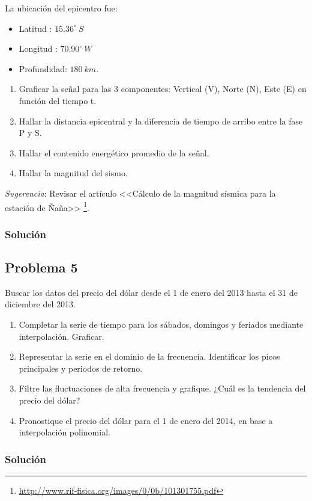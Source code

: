 \documentclass[a4paper,12pt,final]{article}
\begin{document}
      \noindent La ubicación del epicentro fue:

      \begin{itemize}
        \item Latitud    : $15.36^\circ\ S$
        \item Longitud   : $70.90^\circ\ W$
        \item Profundidad: $180\ km$.
      \end{itemize}

      \begin{enumerate}[label=\alph*)]
        \item Graficar la señal para las 3 componentes: Vertical (V), Norte (N), Este (E) en función del tiempo t.
        \item Hallar la distancia epicentral y la diferencia de tiempo de arribo entre la fase P y S.
        \item Hallar el contenido energético promedio de la señal.
        \item Hallar la magnitud del sismo.
      \end{enumerate}

      \noindent \emph{Sugerencia}: Revisar el artículo <<Cálculo de la magnitud sísmica para la estación de Ñaña>>
      \footnote{\url{http://www.rif-fisica.org/images/0/0b/101301755.pdf}}.

    \subsubsection*{Solución}

  \newpage
  \subsection*{Problema 5}
    \noindent Buscar los datos del precio del dólar desde el 1 de enero del 2013
      hasta el 31 de diciembre del 2013.

      \begin{enumerate}[label=\alph*)]
        \item Completar la serie de tiempo para los sábados, domingos y feriados mediante interpolación. Graficar.
        \item Representar la serie en el dominio de la frecuencia. Identificar los picos principales y periodos de retorno.
        \item Filtre las fluctuaciones de alta frecuencia y grafique. ¿Cuál es la tendencia del precio del dólar?
        \item Pronostique el precio del dólar para el 1 de enero del 2014, en base a interpolación polinomial.
      \end{enumerate}

    \subsubsection*{Solución}
\end{document}

